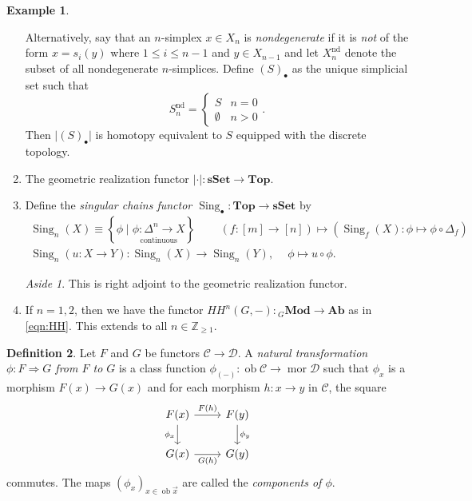 \documentclass[10pt,letterpaper,cm]{nupset}
\theoremstyle{definition}
\newtheorem{definition}{Definition}[subsection]
\newtheorem{exmp}[definition]{Example}
\theoremstyle{theorem}
\theoremstyle{remark}
\newtheorem*{aside}{Aside}
\newcommand{\Z}{\mathbb Z}
\newcommand{\1}{\mathbf{1}}
\renewcommand{\c}{\mathscr{C}}
\renewcommand{\d}{\mathscr{D}}
\newcommand{\x}{\vec x}
\newcommand{\0}{\vec 0}
\DeclareMathOperator{\nd}{nd}
\DeclareMathOperator{\mor}{mor}
\DeclareMathOperator{\ob}{ob}
\DeclareMathOperator{\Sing}{Sing}
\begin{document}
\begin{exmp}
\begin{enumerate}
Alternatively, say that an $n$-simplex  $x\in X_n$ is \textit{nondegenerate} if it is \emph{not} of the form $x =s_i(y)$ where $1\leq i \leq n-1$ and $y\in X_{n-1}$ and let $X_n^{\nd}$ denote the subset of all nondegenerate $n$-simplices.  Define $(S)_{\bullet}$ as the unique simplicial set such that $$S_n^{\nd} = \begin{cases}
S & n =0 \\ \emptyset & n > 0 \end{cases}.$$ Then
 $\lvert{(S)_{\bullet}}\rvert$ is homotopy equivalent to $S$ equipped with the discrete topology. 
\item The geometric realization functor $\lvert{\cdot}\rvert : \mathbf{sSet} \to \mathbf{Top}$.
\item Define the \textit{singular chains functor $\Sing_{\bullet} : \mathbf{Top} \to \mathbf{sSet}$} by
\begin{gather*}
 \Sing_n(X) \equiv \left\{\phi \mid \underset{\text{continuous}}{\phi  : \Delta^n \to X}\right\} \quad \ \quad \left(f: [m] \to [n]\right) \mapsto \left(\Sing_f(X) : \phi \mapsto \phi \circ \Delta_f\right)
 \\ \Sing_n(u : X \to Y) : \Sing_n(X) \to \Sing_n(Y),\ \quad \phi \mapsto u \circ \phi.
 \end{gather*}
\begin{aside} This is right adjoint to the geometric realization functor. \end{aside}
\item If $n=1,2$, then we have the functor ${HH}^n(G, -) : {}_{G}\mathbf{Mod} \to \mathbf{Ab}$ as in \eqref{eqn:HH}. This extends to all $n\in \Z_{\geq 1}$.
\end{enumerate}
\end{exmp}

\smallskip

\begin{definition}
Let $F$ and $G$ be functors $\c \to \d$. A \textit{natural transformation $\phi: F\Rightarrow G$ from $F$ to $G$} is a class function $\phi_{(-)}: \ob{\c} \to \mor{\d}$ such that $\phi_x$ is a morphism $F(x) \to G(x)$ and for each morphism $h: x\to y$ in $\c$, the square
\[
\begin{tikzcd}
F(x) \arrow[d, "\phi_x"'] \arrow[r, "F(h)"] & F(y) \arrow[d, "\phi_y"] \\
G(x) \arrow[r, "G(h)"']                  & G(y)                 
\end{tikzcd}
\] commutes. The maps $\left(\phi_x\right)_{x\in \ob{\x}}$ are called the \textit{components of $\phi$}.
\end{definition}
\end{document}
